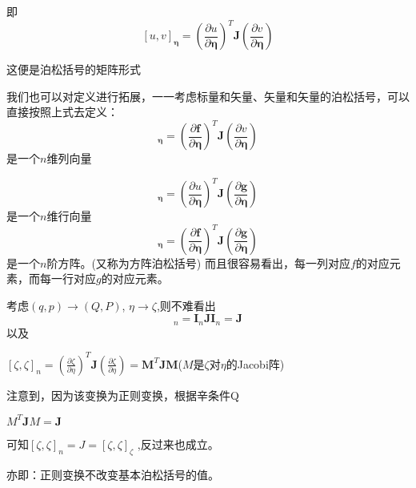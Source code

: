 \documentclass[12pt]{ctexart}
\begin{document}
即
\begin{equation}
  \boxed{[u,v]_{\boldsymbol{\eta}} = \left(\frac{\partial u}{\partial \boldsymbol{\eta}}\right)^T \boldsymbol{J} \left(\frac{\partial v}{\partial \boldsymbol{\eta}}\right)}
    \end{equation}
  
这便是泊松括号的矩阵形式

我们也可以对定义进行拓展，一一考虑标量和矢量、矢量和矢量的泊松括号，可以直接按照上式去定义：
    \begin{equation}
    [\boldsymbol{f},v]_{\boldsymbol{\eta}} = \left(\frac{\partial \boldsymbol{f}}{\partial \boldsymbol{\eta}}\right)^T \boldsymbol{J} \left(\frac{\partial v}{\partial \boldsymbol{\eta}}\right)
    \end{equation}
    是一个$n$维列向量
  
    \begin{equation}
    [u,\boldsymbol{g}]_{\boldsymbol{\eta}} = \left(\frac{\partial u}{\partial \boldsymbol{\eta}}\right)^T \boldsymbol{J} \left(\frac{\partial \boldsymbol{g}}{\partial \boldsymbol{\eta}}\right)
    \end{equation}
是一个$n$维行向量
    \begin{equation}
    [\boldsymbol{f},\boldsymbol{g}]_{\boldsymbol{\eta}} = \left(\frac{\partial \boldsymbol{f}}{\partial \boldsymbol{\eta}}\right)^T \boldsymbol{J} \left(\frac{\partial \boldsymbol{g}}{\partial \boldsymbol{\eta}}\right)
    \end{equation}
是一个$n$阶方阵。(又称为方阵泊松括号)
而且很容易看出，每一列对应$f$的对应元素，而每一行对应$g$的对应元素。

考虑$( q, p) \to ( Q, P)$, $\eta \to \zeta$,则不难看出
\begin{equation}
    [\boldsymbol{\eta},\boldsymbol{\eta}]_n=\boldsymbol{I}_n\boldsymbol{J}\boldsymbol{I}_n=\boldsymbol{J}
    \end{equation}
以及

$[\zeta,\zeta]_n=\left(\frac{\partial\zeta}{\partial\eta}\right)^T\boldsymbol{J}\left(\frac{\partial\zeta}{\partial\eta}\right)=\boldsymbol{M}^T\boldsymbol{J}\boldsymbol{M}$($M$是$\zeta$对$\eta$的Jacobi阵)

注意到，因为该变换为正则变换，根据辛条件Q

$M^T\boldsymbol{J}M=\boldsymbol{J}$

可知$[\zeta,\zeta]_n=J=[\zeta,\zeta]_\zeta$ ,反过来也成立。

亦即：正则变换不改变基本泊松括号的值。
\end{document}
